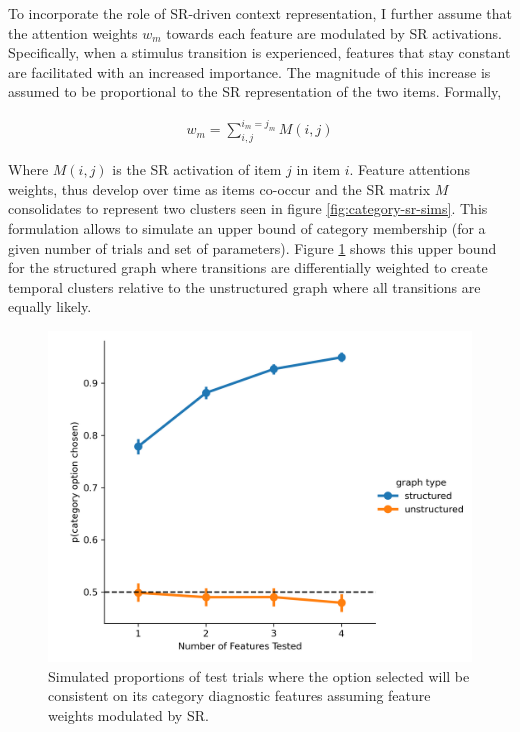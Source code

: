 To incorporate the role of SR-driven context representation, I further assume that the attention weights $w_m$ towards each feature are modulated by SR activations. Specifically, when a stimulus transition is experienced, features that stay constant are facilitated with an increased importance. The magnitude of this increase is assumed to be proportional to the SR representation of the two items. Formally, 

\begin{equation}
    \begin{aligned}
        w_m = \sum_{i, j}^{i_m = j_m} M(i, j)
    \end{aligned}
\end{equation}

Where $M(i, j)$ is the SR activation of item $j$ in item $i$. Feature attentions weights, thus develop over time as items co-occur and the SR matrix $M$ consolidates to represent two clusters seen in figure \ref{fig:category-sr-sims}. This formulation allows to simulate an upper bound of category membership (for a given number of trials and set of parameters). Figure \ref{fig:sr-cat-selection-sims} shows this upper bound for the structured graph where transitions are differentially weighted to create temporal clusters relative to the unstructured graph where all transitions are equally likely. 

\begin{figure}[ht]
    \centering
    \label{fig:sr-cat-selection-sims}
    \includegraphics[width = \textwidth]{chapter_notebooks/chapter_4/figures/cat_simulations.png}
    \caption{Simulated proportions of test trials where the option selected will be consistent on its category diagnostic features assuming feature weights modulated by SR.}
\end{figure}

